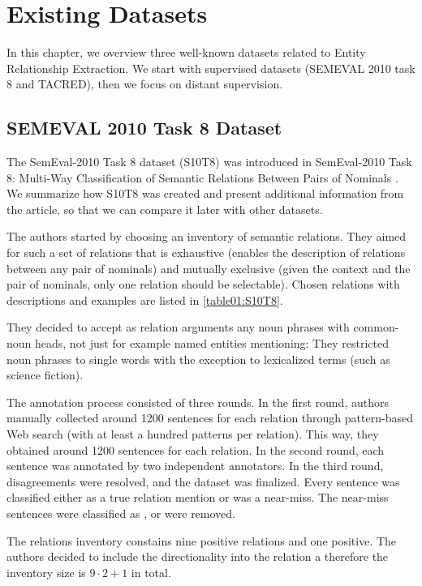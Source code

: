\chapter{Existing Datasets}
\label{chap:datasets}

In this chapter, we overview three well-known datasets related to Entity Relationship Extraction. We start with supervised datasets (SEMEVAL 2010 task 8 and TACRED), then we focus on distant supervision.


\section{SEMEVAL 2010 Task 8 Dataset}
The SemEval-2010 Task 8 dataset (S10T8) was introduced in SemEval-2010 Task 8: Multi-Way Classification of Semantic Relations Between Pairs of Nominals \citep{semeval}. We summarize how S10T8 was created and present additional information from the article, so that we can compare it later with other datasets.

The authors started by choosing an inventory of semantic relations. They aimed for such a set of relations that is exhaustive (enables the description of relations between any pair of nominals) and mutually exclusive (given the context and the pair of nominals, only one relation should be selectable).  Chosen relations with descriptions and examples are listed in \autoref{table01:S10T8}. 

They decided to accept as relation arguments any noun phrases with common-noun heads, not just for example named entities mentioning:  They restricted noun phrases to single words with the exception to lexicalized terms (such as science fiction).

The annotation process consisted of three rounds. In the first round, authors manually collected around \num{1200} sentences for each relation through pattern-based Web search (with at least a hundred patterns per relation). This way, they obtained around \num{1200} sentences for each relation. In the second round, each sentence was annotated by two independent annotators. In the third round, disagreements were resolved, and the dataset was finalized. Every sentence was classified either as a true relation mention or was a near-miss. The near-miss sentences were classified as , or were removed.

The relations inventory constains nine positive relations and one positive. The authors decided to include the directionality into the relation a therefore the inventory size is $9 \cdot 2 + 1$ in total. 

